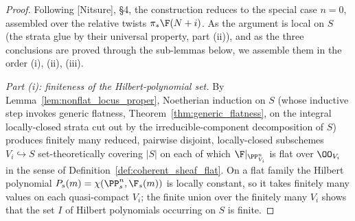 \begin{proof}
  Following [Nitsure], \S4, the construction reduces to the special case
  \(n = 0\), assembled over the relative twists \(\pi_* \F(N+i)\).  As the
  argument is local on \(S\) (the strata glue by their universal property, part
  (ii)), and as the three conclusions are proved through the sub-lemmas below,
  we assemble them in the order (i), (ii), (iii).

  \emph{Part (i): finiteness of the Hilbert-polynomial set.}
  By Lemma~\ref{lem:nonflat_locus_proper}, Noetherian induction on \(S\) (whose
  inductive step invokes generic flatness, Theorem~\ref{thm:generic_flatness},
  on the integral locally-closed strata cut out by the irreducible-component
  decomposition of \(S\)) produces finitely many reduced, pairwise disjoint,
  locally-closed subschemes \(V_i \hookrightarrow S\) set-theoretically covering
  \(|S|\) on each of which \(\F|_{\PP^n_{V_i}}\) is flat over \(\OO_{V_i}\) in
  the sense of Definition~\ref{def:coherent_sheaf_flat}.  On a flat family the
  Hilbert polynomial \(P_s(m) = \chi(\PP^n_s, \F_s(m))\) is locally constant, so
  it takes finitely many values on each quasi-compact \(V_i\); the finite union
  over the finitely many \(V_i\) shows that the set \(I\) of Hilbert polynomials
  occurring on \(S\) is finite.


\end{proof}
